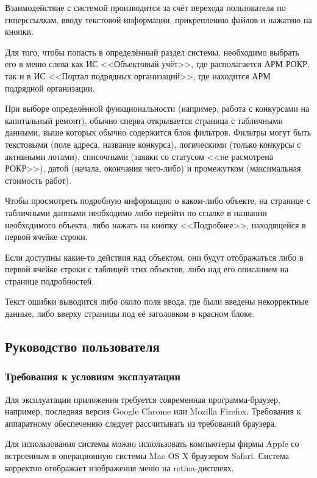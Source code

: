 Взаимодействие с системой производится за счёт перехода пользователя по гиперссылкам, вводу текстовой информации, прикреплению файлов и нажатию на кнопки.

Для того, чтобы попасть в определённый раздел системы, необходимо выбрать его в меню слева как ИС <<Объектовый учёт>>, где располагается АРМ РОКР, так и в ИС <<Портал подрядных организаций>>, где находится АРМ подрядной организации.

При выборе определённой функциональности (например, работа с конкурсами на капитальный ремонт), обычно сперва открывается страница с табличными данными, выше которых обычно содержится блок фильтров.
Фильтры могут быть текстовыми (поле адреса, название конкурса), логическими (только конкурсы с активными лотами), списочными (заявки со статусом <<не расмотрена РОКР>>), датой (начала, окончания чего-либо) и промежутком (максимальная стоимость работ).

Чтобы просмотреть подробную информацию о каком-либо объекте, на странице с табличными данными необходимо либо перейти по ссылке в названии необходимого объекта, либо нажать на кнопку <<Подробнее>>, находящейся в первой ячейке строки.

Если доступны какие-то действия над объектом, они будут отображаться либо в первой ячейке строки с таблицей этих объектов, либо над его описанием на странице подробностей.

Текст ошибки выводится либо около поля ввода, где были введены некорректные данные, либо вверху страницы под её заголовком в красном блоке.

\subsection{Руководство пользователя}

\subsubsection{Требования к условиям эксплуатации}

Для эксплуатации приложения требуется современная программа-браузер, например, последняя версия Google Chrome или Mozilla Firefox.
Требования к аппаратному обеспечению следует рассчитывать из требований браузера.

Для использования системы можно использовать компьютеры фирмы Apple со встроенным в операционную системы Mac OS X браузером Safari.
Система корректно отображает изображения меню на retina-дисплеях.

